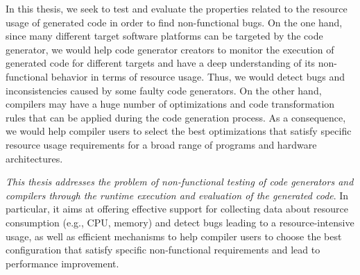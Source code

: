 In this thesis, we seek to test and evaluate the properties related to the resource usage of generated code in order to find non-functional bugs. 
On the one hand, since many different target software platforms can be targeted by the code generator, we would help code generator creators to monitor the execution of generated code for different targets and have a deep understanding of its non-functional behavior in terms of resource usage. Thus, we would detect bugs and inconsistencies caused by some faulty code generators. 
On the other hand, compilers may have a huge number of optimizations and code transformation rules that can be applied during the code generation process. As a consequence, we would help compiler users to select the best optimizations that satisfy specific resource usage requirements for a broad range of programs and hardware architectures.

\textit{This thesis addresses the problem of non-functional testing of code generators and compilers through the runtime execution and evaluation of the generated code}. In particular, it aims at offering effective support for collecting data about resource consumption (e.g., CPU, memory) and detect bugs leading to a resource-intensive usage, as well as efficient mechanisms to help compiler users to choose the best configuration that satisfy specific non-functional requirements and lead to performance improvement.


